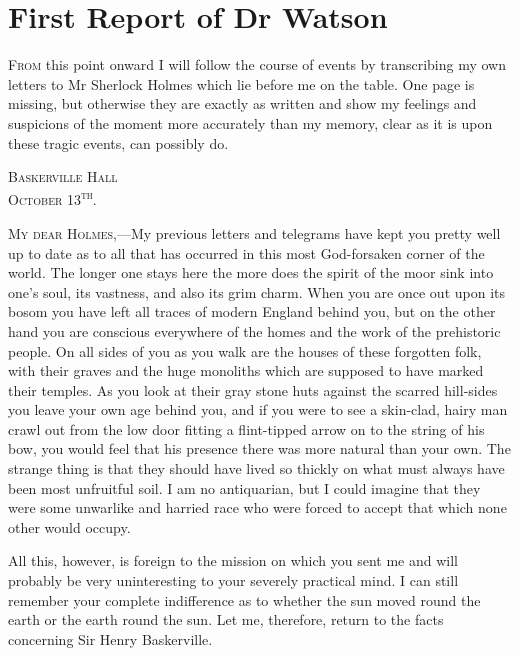 \chapter{First Report of Dr Watson}
\lettrine[lines=1]{F}{rom} this point onward I will follow the course of events by transcribing my own letters to Mr Sherlock Holmes which lie before me on the table. One page is missing, but otherwise they are exactly as written and show my feelings and suspicions of the moment more accurately than my memory, clear as it is upon these tragic events, can possibly do.\\

\begin{flushright}
\hfill\begin{minipage}{0.5\linewidth}\textsc{Baskerville Hall\\October 13\textsuperscript{th}.}\end{minipage}
\end{flushright}

\vspace{8pt}

\textsc{My dear Holmes},—My previous letters and telegrams have kept you pretty well up to date as to all that has occurred in this most God-forsaken corner of the world. The longer one stays here the more does the spirit of the moor sink into one's soul, its vastness, and also its grim charm. When you are once out upon its bosom you have left all traces of modern England behind you, but on the other hand you are conscious everywhere of the homes and the work of the prehistoric people. On all sides of you as you walk are the houses of these forgotten folk, with their graves and the huge monoliths which are supposed to have marked their temples. As you look at their gray stone huts against the scarred hill-sides you leave your own age behind you, and if you were to see a skin-clad, hairy man crawl out from the low door fitting a flint-tipped arrow on to the string of his bow, you would feel that his presence there was more natural than your own. The strange thing is that they should have lived so thickly on what must always have been most unfruitful soil. I am no antiquarian, but I could imagine that they were some unwarlike and harried race who were forced to accept that which none other would occupy.

All this, however, is foreign to the mission on which you sent me and will probably be very uninteresting to your severely practical mind. I can still remember your complete indifference as to whether the sun moved round the earth or the earth round the sun. Let me, therefore, return to the facts concerning Sir Henry Baskerville.

